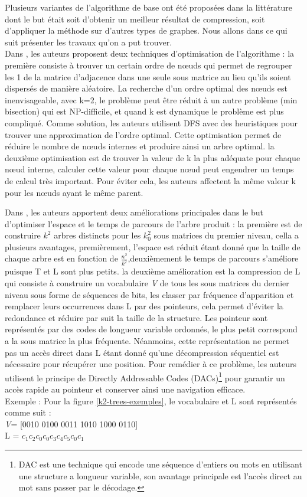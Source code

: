 Plusieurs variantes de l'algorithme de base ont été proposées dans la littérature dont le but était soit d'obtenir un meilleur résultat de compression, soit d'appliquer la méthode sur d'autres types de graphes. Nous allons dans ce qui suit présenter les travaux qu'on a put trouver.\\

Dans \citep{shi2012optimizing}, les auteurs proposent deux techniques d'optimisation de l'algorithme : la première consiste à trouver un certain ordre de nœuds qui permet de regrouper les 1 de la matrice d'adjacence dans une seule sous matrice au lieu qu'ils soient dispersés de manière aléatoire. La recherche d'un ordre optimal des nœuds est inenvisageable, avec k=2, le problème peut être réduit à un autre problème (min bisection) qui est NP-difficile, et quand k est dynamique le problème est plus compliqué. Comme solution, les auteurs utilisent DFS avec des heuristiques pour trouver une approximation de l'ordre optimal. Cette optimisation permet de réduire le nombre de nœuds internes et produire ainsi un arbre optimal. la deuxième optimisation est de trouver la valeur de k la plus adéquate pour chaque nœud interne, calculer cette valeur pour chaque nœud peut engendrer un temps de calcul très important. Pour éviter cela, les auteurs affectent la même valeur k pour les nœuds ayant le même parent. 	

Dans \citep{brisaboa2014compact}, les auteurs apportent deux améliorations principales dans le but d'optimiser l'espace et le temps de parcours de l'arbre produit : la première est de construire $k^2$ arbres distincts pour les $k_{0}^{2}$ sous matrices du premier niveau, cella a plusieurs avantages, premièrement, l'espace est réduit étant donné que la taille de chaque arbre est en fonction de $\frac{n^2}{k^2}$,deuxièmement le temps de parcours s'améliore puisque T et L sont plus petits. la deuxième amélioration est la compression de L qui consiste à construire un vocabulaire \textit{V} de tous les sous matrices du dernier niveau sous forme de séquences de bits, les classer par fréquence d'apparition et remplacer leurs occurrences dans L par des pointeurs, cela permet d'éviter la redondance et réduire par suit la taille de la structure. Les pointeur sont représentés par des codes de longueur variable ordonnés, le plus petit correspond a la sous matrice la plus fréquente. Néanmoins, cette représentation ne permet  pas un accès direct dans L étant donné qu'une décompression séquentiel est nécessaire pour récupérer une position. Pour remédier à ce problème, les auteurs utilisent le principe de Directly Addressable Codes (DACs)\footnote{DAC est une technique qui encode une séquence d'entiers ou mots en utilisant une structure a longueur variable, son avantage principale est l'accès direct au mot sans passer par le décodage.} \citep{brisaboa2013dacs} pour garantir un accès rapide au pointeur et conserver ainsi une navigation efficace.\\
Exemple : Pour la figure \ref{k2-trees-exemples}, le vocabulaire et L sont représentés comme suit :\\
\textit{V}= [0010 0100 0011 1010 1000 0110]\\
L = $c_{1}c_{2}c_{0}c_{0}c_{3}c_{4}c_{5}c_{0}c_{1}$ \\


